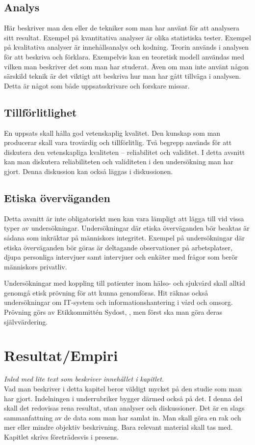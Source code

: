 \documentclass[a4paper,12pt]{article} %
\begin{document}
\subsection{Analys}
Här beskriver man den eller de tekniker som man har använt för att analysera sitt resultat. Exempel på kvantitativa analyser är olika statistiska tester. Exempel på kvalitativa analyser är innehållsanalys och kodning. Teorin används i analysen för att beskriva och förklara. Exempelvis kan en teoretisk modell användas med vilken man beskriver det som man har studerat. Även om man inte använt någon särskild teknik är det viktigt att beskriva hur man har gått tillväga i analysen. Detta är något som både uppsatsskrivare och forskare missar.

\subsection{Tillförlitlighet}
En uppsats skall hålla god vetenskaplig kvalitet. Den kunskap som man producerar skall vara trovärdig och tillförlitlig. Två begrepp används för att diskutera den vetenskapliga kvaliteten – reliabilitet och validitet. I detta avsnitt kan man diskutera reliabiliteten och validiteten i den undersökning man har gjort. Denna diskussion kan också läggas i diskussionen.

\subsection{Etiska överväganden}
Detta avsnitt är inte obligatoriskt men kan vara lämpligt att lägga till vid vissa typer av undersökningar. Undersökningar där etiska överväganden bör beaktas är sådana som inkräktar på människors integritet. Exempel på undersökningar där etiska överväganden bör göras är deltagande observationer på arbetsplatser, djupa personliga intervjuer samt intervjuer och enkäter med frågor som berör människors privatliv.

Undersökningar med koppling till patienter inom hälso- och sjukvård skall alltid genomgå etisk prövning för att kunna genomföras. Hit räknas också undersökningar om IT-system och informationshantering i vård och omsorg. Prövning görs av Etikkommittén Sydost, \cite{etik}, men först ska man göra deras självvärdering.

\newpage

\section{Resultat/Empiri}
\emph{Inled med lite text som beskriver innehållet i kapitlet.}\\
Vad man beskriver i detta kapitel beror väldigt mycket på den studie som man har gjort. Indelningen i underrubriker bygger därmed också på det. I denna del skall det redovisas rena resultat, utan analyser och diskussioner. Det är en slags sammanfattning av de data som man har samlat in. Man skall göra en rak och mer eller mindre objektiv beskrivning. Bara relevant material skall tas med. Kapitlet skrivs företrädesvis i presens.
\end{document}
